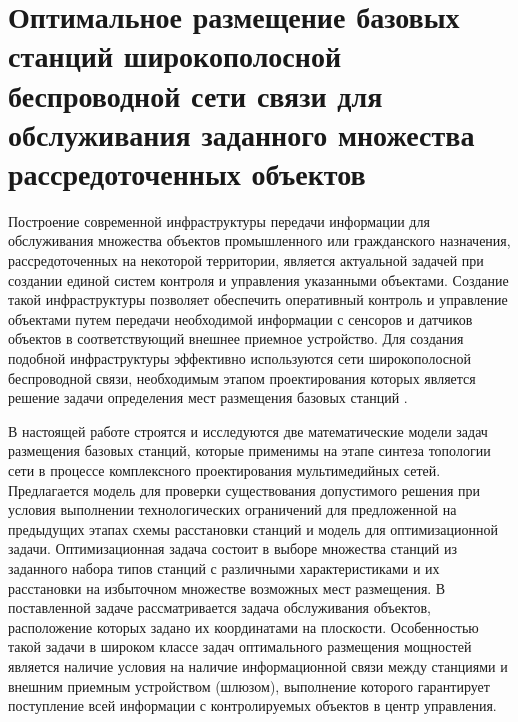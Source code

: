 \chapter{Оптимальное размещение базовых станций широкополосной беспроводной сети связи для обслуживания заданного множества рассредоточенных объектов}\label{ch:ch2}

Построение современной инфраструктуры передачи информации для обслуживания множества объектов промышленного или гражданского назначения, рассредоточенных на некоторой территории, является актуальной задачей при создании единой систем контроля и управления указанными объектами.  Создание такой инфраструктуры позволяет обеспечить оперативный контроль и управление объектами путем передачи необходимой информации с сенсоров и датчиков объектов в соответствующий внешнее приемное устройство. Для создания подобной инфраструктуры эффективно используются сети широкополосной беспроводной связи, необходимым этапом проектирования которых является решение задачи определения мест размещения базовых станций \cite{VishnevskyBook}.



В настоящей работе строятся и исследуются две математические модели задач размещения базовых станций, которые применимы на этапе синтеза топологии сети в процессе комплексного проектирования мультимедийных сетей. Предлагается модель для проверки существования допустимого решения при условия выполнении технологических ограничений для предложенной на предыдущих этапах схемы расстановки станций и модель для оптимизационной задачи. Оптимизационная задача состоит в выборе множества станций из заданного набора типов станций с различными характеристиками и их расстановки на избыточном множестве возможных мест размещения. В поставленной задаче рассматривается задача обслуживания объектов, расположение которых задано их координатами на плоскости. Особенностью такой задачи в широком классе задач оптимального размещения мощностей является наличие условия на наличие информационной связи между станциями и внешним приемным устройством (шлюзом), выполнение которого гарантирует поступление всей информации с контролируемых объектов в центр управления.

